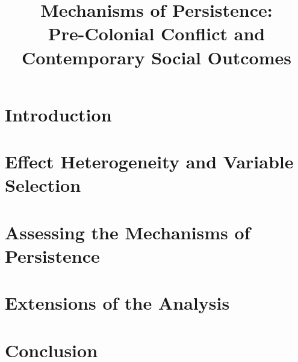 \documentclass[10.5pt]{article}
\title{Mechanisms of Persistence: \\ Pre-Colonial Conflict and Contemporary Social Outcomes}
\begin{document}
\maketitle

\begin{abstract}

\end{abstract}

\section{Introduction}



\section{Effect Heterogeneity and Variable Selection}



\section{Assessing the Mechanisms of Persistence}



\section{Extensions of the Analysis}



\section{Conclusion}



\clearpage

 
 
\end{document}
